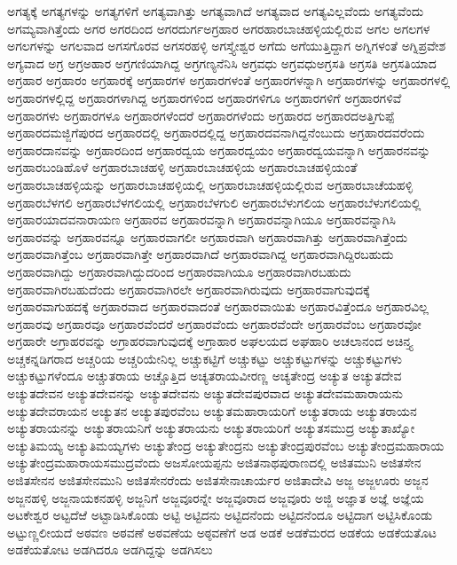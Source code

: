 {ಅಗತ್ಯಕ್ಕೆ
ಅಗತ್ಯಗಳನ್ನು
ಅಗತ್ಯಗಳಿಗೆ
ಅಗತ್ಯವಾಗಿತ್ತು
ಅಗತ್ಯವಾಗಿದೆ
ಅಗತ್ಯವಾದ
ಅಗತ್ಯವಿಲ್ಲವೆಂದು
ಅಗತ್ಯವೆಂದು
ಅಗಮ್ಯವಾಗಿತ್ತೆಂದು
ಅಗರ
ಅಗರದಿಂದ
ಅಗರದುರ್ಗಅಗ್ರಹಾರ
ಅಗರಹಾರಬಾಚಹಳ್ಳಿಯಲ್ಲಿರುವ
ಅಗಲ
ಅಗಲಗಳ
ಅಗಲಗಳನ್ನು
ಅಗಲವಾದ
ಅಗಸಗೊರವ
ಅಗಸರಹಳ್ಳಿ
ಅಗಸ್ತ್ಯೇಶ್ವರ
ಅಗೆದು
ಅಗೆಯುತ್ತಿದ್ದಾಗ
ಅಗ್ನಿಗಳಂತೆ
ಅಗ್ನಿಪ್ರವೇಶ
ಅಗ್ಯವಾದ
ಅಗ್ರ
ಅಗ್ರಅಹಾರ
ಅಗ್ರಗಣಿಯಾಗಿದ್ದ
ಅಗ್ರಗಣ್ಯನೆನಿಸಿ
ಅಗ್ರವಧು
ಅಗ್ರವಧುಅಗ್ರಸತಿ
ಅಗ್ರಸತಿ
ಅಗ್ರಸತಿಯಾದ
ಅಗ್ರಹಾರ
ಅಗ್ರಹಾರಂ
ಅಗ್ರಹಾರಕ್ಕೆ
ಅಗ್ರಹಾರಗಳ
ಅಗ್ರಹಾರಗಳಂತೆ
ಅಗ್ರಹಾರಗಳನ್ನಾಗಿ
ಅಗ್ರಹಾರಗಳನ್ನು
ಅಗ್ರಹಾರಗಳಲ್ಲಿ
ಅಗ್ರಹಾರಗಳಲ್ಲಿದ್ದ
ಅಗ್ರಹಾರಗಳಾಗಿದ್ದ
ಅಗ್ರಹಾರಗಳಿಂದ
ಅಗ್ರಹಾರಗಳಿಗೂ
ಅಗ್ರಹಾರಗಳಿಗೆ
ಅಗ್ರಹಾರಗಳಿವೆ
ಅಗ್ರಹಾರಗಳು
ಅಗ್ರಹಾರಗಳೂ
ಅಗ್ರಹಾರಗಳೆಂದರೆ
ಅಗ್ರಹಾರಗಳೆಂದು
ಅಗ್ರಹಾರದ
ಅಗ್ರಹಾರದಅತ್ತಿಗುಪ್ಪೆ
ಅಗ್ರಹಾರದಮಜ್ಜಿಗೆಪುರದ
ಅಗ್ರಹಾರದಲ್ಲಿ
ಅಗ್ರಹಾರದಲ್ಲಿದ್ದ
ಅಗ್ರಹಾರದವನಾಗಿದ್ದನೆಂಬುದು
ಅಗ್ರಹಾರದವರೆಂದು
ಅಗ್ರಹಾರದಾನವನ್ನು
ಅಗ್ರಹಾರದಿಂದ
ಅಗ್ರಹಾರದ್ವಯ
ಅಗ್ರಹಾರದ್ವಯಂ
ಅಗ್ರಹಾರದ್ವಯವನ್ನಾಗಿ
ಅಗ್ರಹಾರನವನ್ನು
ಅಗ್ರಹಾರಬಂಡಿಹೊಳೆ
ಅಗ್ರಹಾರಬಾಚಹಳ್ಳಿ
ಅಗ್ರಹಾರಬಾಚಹಳ್ಳಿಯ
ಅಗ್ರಹಾರಬಾಚಹಳ್ಳಿಯಂತೆ
ಅಗ್ರಹಾರಬಾಚಹಳ್ಳಿಯನ್ನು
ಅಗ್ರಹಾರಬಾಚಹಳ್ಳಿಯಲ್ಲಿ
ಅಗ್ರಹಾರಬಾಚಹಳ್ಳಿಯಲ್ಲಿರುವ
ಅಗ್ರಹಾರಬಾಚೆಯಹಳ್ಳಿ
ಅಗ್ರಹಾರಬೆಳಗಲಿ
ಅಗ್ರಹಾರಬೆಳಗಲಿಯಲ್ಲಿ
ಅಗ್ರಹಾರಬೆಳಗುಲಿ
ಅಗ್ರಹಾರಬೆಳುಗಲಿಯ
ಅಗ್ರಹಾರಬೆಳುಗಲಿಯಲ್ಲಿ
ಅಗ್ರಹಾರಯಾದವನಾರಾಯಣ
ಅಗ್ರಹಾರವ
ಅಗ್ರಹಾರವನ್ನಾಗಿ
ಅಗ್ರಹಾರವನ್ನಾಗಿಯೂ
ಅಗ್ರಹಾರವನ್ನಾಗಿಸಿ
ಅಗ್ರಹಾರವನ್ನು
ಅಗ್ರಹಾರವನ್ನೂ
ಅಗ್ರಹಾರವಾಗಲೀ
ಅಗ್ರಹಾರವಾಗಿ
ಅಗ್ರಹಾರವಾಗಿತ್ತು
ಅಗ್ರಹಾರವಾಗಿತ್ತೆಂದು
ಅಗ್ರಹಾರವಾಗಿತ್ತೆಂಬ
ಅಗ್ರಹಾರವಾಗಿತ್ತೇ
ಅಗ್ರಹಾರವಾಗಿದೆ
ಅಗ್ರಹಾರವಾಗಿದ್ದ
ಅಗ್ರಹಾರವಾಗಿದ್ದಿರಬಹುದು
ಅಗ್ರಹಾರವಾಗಿದ್ದು
ಅಗ್ರಹಾರವಾಗಿದ್ದುದರಿಂದ
ಅಗ್ರಹಾರವಾಗಿಯೂ
ಅಗ್ರಹಾರವಾಗಿರಬಹುದು
ಅಗ್ರಹಾರವಾಗಿರಬಹುದೆಂದು
ಅಗ್ರಹಾರವಾಗಿರಲೇ
ಅಗ್ರಹಾರವಾಗಿರುವುದು
ಅಗ್ರಹಾರವಾಗುವುದಕ್ಕೆ
ಅಗ್ರಹಾರವಾಗುಹದಕ್ಕೆ
ಅಗ್ರಹಾರವಾದ
ಅಗ್ರಹಾರವಾದಂತೆ
ಅಗ್ರಹಾರವಾಯಿತು
ಅಗ್ರಹಾರವಿತ್ತೆಂದೂ
ಅಗ್ರಹಾರವಿಲ್ಲ
ಅಗ್ರಹಾರವು
ಅಗ್ರಹಾರವೂ
ಅಗ್ರಹಾರವೆಂದರೆ
ಅಗ್ರಹಾರವೆಂದು
ಅಗ್ರಹಾರವೆಂದೇ
ಅಗ್ರಹಾರವೆಂಬ
ಅಗ್ರಹಾರವೋ
ಅಗ್ರಹಾರೇ
ಅಗ್ರಾಹರವನ್ನು
ಅಗ್ರಾಹರವಾಗುವುದಕ್ಕೆ
ಅಗ್ರಾಹಾರ
ಅಘಲಯದ
ಅಘಹಾರಿ
ಅಚಲಾನಂದ
ಅಚಿನ್ತ್ಯ
ಅಚ್ಚಕನ್ನಡಿಗರಾದ
ಅಚ್ಚರಿಯ
ಅಚ್ಚರಿಯೇನಿಲ್ಲ
ಅಚ್ಚುಕಟ್ಟಿಗೆ
ಅಚ್ಚುಕಟ್ಟು
ಅಚ್ಚುಕಟ್ಟುಗಳನ್ನು
ಅಚ್ಚುಕಟ್ಟುಗಳು
ಅಚ್ಚುಕಟ್ಟುಗಳೆಂದೂ
ಅಚ್ಚುತರಾಯ
ಅಚ್ಚೊತ್ತಿದ
ಅಚ್ಯತರಾಯವೀರಣ್ಣ
ಅಚ್ಯತೇಂದ್ರ
ಅಚ್ಯುತ
ಅಚ್ಯುತದೇವ
ಅಚ್ಯುತದೇವನ
ಅಚ್ಯುತದೇವನನ್ನು
ಅಚ್ಯುತದೇವನು
ಅಚ್ಯುತದೇವಪುರವಾದ
ಅಚ್ಯುತದೇವಮಹಾರಾಯನು
ಅಚ್ಯುತದೇವರಾಯನ
ಅಚ್ಯುತನ
ಅಚ್ಯುತಪುರವೆಂಬ
ಅಚ್ಯುತಮಹಾರಾಯರಿಗೆ
ಅಚ್ಯುತರಾಯ
ಅಚ್ಯುತರಾಯನ
ಅಚ್ಯುತರಾಯನನ್ನು
ಅಚ್ಯುತರಾಯನಿಗೆ
ಅಚ್ಯುತರಾಯನು
ಅಚ್ಯುತರಾಯರಿಗೆ
ಅಚ್ಯುತಸಮುದ್ರ
ಅಚ್ಯುತಾಖ್ಯೋ
ಅಚ್ಯುತಿಮಯ್ಯ
ಅಚ್ಯುತಿಮಯ್ಯಗಳು
ಅಚ್ಯುತೇಂದ್ರ
ಅಚ್ಯುತೇಂದ್ರನು
ಅಚ್ಯುತೇಂದ್ರಪುರವೆಂಬ
ಅಚ್ಯುತೇಂದ್ರಮಹಾರಾಯ
ಅಚ್ಯುತೇಂದ್ರಮಹಾರಾಯಸಮುದ್ರವೆಂದು
ಅಜಸೋಯಪ್ಪನು
ಅಜಿತನಾಥಪುರಾಣದಲ್ಲಿ
ಅಜಿತಮುನಿ
ಅಜಿತಸೇನ
ಅಜಿತಸೇನನ
ಅಜಿತಸೇನಮುನಿ
ಅಜಿತಸೇನರೆಂದು
ಅಜಿತಸೇನಾಚಾರ್ಯರ
ಅಜಿತಾದೇವಿ
ಅಜ್ಜ
ಅಜ್ಜಊರು
ಅಜ್ಜನ
ಅಜ್ಜನಹಳ್ಳಿ
ಅಜ್ಜನಾಯಕನಹಳ್ಳಿ
ಅಜ್ಜನಿಗೆ
ಅಜ್ಜವೂರನ್ನೇ
ಅಜ್ಜವೂರಾದ
ಅಜ್ಜವೂರು
ಅಜ್ಜಿ
ಅಜ್ಞಾತ
ಅಜ್ಞೆ
ಅಜ್ಞೆಯ
ಅಟಕೇಶ್ವರ
ಅಟ್ಟದೆಱೆ
ಅಟ್ಟಾಡಿಸಿಕೊಂಡು
ಅಟ್ಟಿ
ಅಟ್ಟಿದನು
ಅಟ್ಟಿದನೆಂದು
ಅಟ್ಟಿದನೆಂದೂ
ಅಟ್ಟಿದಾಗ
ಅಟ್ಟಿಸಿಕೊಂಡು
ಅಟ್ಟುಣ್ಣಲೀಯದೆ
ಅಠವಣ
ಅಠವಣೆ
ಅಠವಣೆಯ
ಅಠ್ಠವಣೆಗೆ
ಅಡ
ಅಡಕೆ
ಅಡಕೆಮರದ
ಅಡಕೆಯ
ಅಡಕೆಯತೊಟ
ಅಡಕೆಯತೋಟ
ಅಡಗಿದರೂ
ಅಡಗಿದ್ದನ್ನು
ಅಡಗಿಸಲು
}
